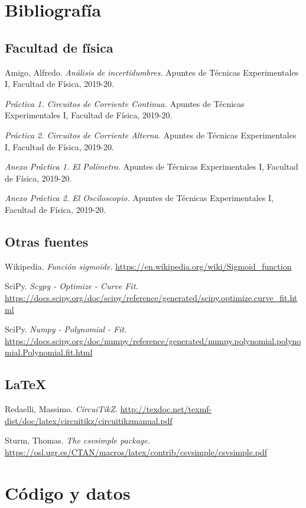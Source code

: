 \documentclass[12pt, a4paper, titlepage]{article}
\begin{document}
\begin{appendices}
    \section{Bibliografía}

    \subsection{Facultad de física}

    Amigo, Alfredo. \textit{Análisis de incertidumbres.} Apuntes de Técnicas Experimentales I, Facultad de Física, 2019-20.

    \textit{Práctica 1. Circuitos de Corriente Continua.} Apuntes de Técnicas Experimentales I, Facultad de Física, 2019-20.

    \textit{Práctica 2. Circuitos de Corriente Alterna.} Apuntes de Técnicas Experimentales I, Facultad de Física, 2019-20.

    \textit{Anexo Práctica 1. El Polímetro.} Apuntes de Técnicas Experimentales I, Facultad de Física, 2019-20.

    \textit{Anexo Práctica 2. El Osciloscopio.} Apuntes de Técnicas Experimentales I, Facultad de Física, 2019-20.

    \subsection{Otras fuentes}

    Wikipedia. \textit{Función sigmoide.} \url{https://en.wikipedia.org/wiki/Sigmoid_function}

    SciPy. \textit{Scypy - Optimize - Curve Fit.} \url{https://docs.scipy.org/doc/scipy/reference/generated/scipy.optimize.curve_fit.html}

    SciPy. \textit{Numpy - Polynomial - Fit.} \url{https://docs.scipy.org/doc/numpy/reference/generated/numpy.polynomial.polynomial.Polynomial.fit.html}

    \subsection{LaTeX}

    Redaelli, Massimo. \textit{CircuiTikZ.} \url{http://texdoc.net/texmf-dist/doc/latex/circuitikz/circuitikzmanual.pdf}

    Sturm, Thomas. \textit{The csvsimple package.} \url{https://osl.ugr.es/CTAN/macros/latex/contrib/csvsimple/csvsimple.pdf}

    \section{Código y datos}


\end{appendices}
\end{document}
